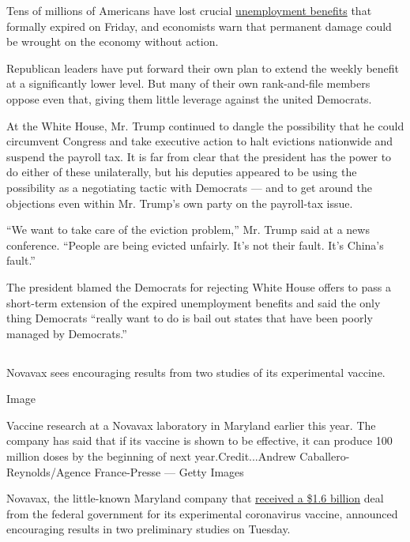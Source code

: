 Tens of millions of Americans have lost crucial
\href{https://slack-redir.net/link?url=https\%3A\%2F\%2Fwww.nytimes3xbfgragh.onion\%2F2020\%2F07\%2F30\%2Fbusiness\%2Funemployment-payments-change.html}{unemployment
benefits} that formally expired on Friday, and economists warn that
permanent damage could be wrought on the economy without action.

Republican leaders have put forward their own plan to extend the weekly
benefit at a significantly lower level. But many of their own
rank-and-file members oppose even that, giving them little leverage
against the united Democrats.

At the White House, Mr. Trump continued to dangle the possibility that
he could circumvent Congress and take executive action to halt evictions
nationwide and suspend the payroll tax. It is far from clear that the
president has the power to do either of these unilaterally, but his
deputies appeared to be using the possibility as a negotiating tactic
with Democrats --- and to get around the objections even within Mr.
Trump's own party on the payroll-tax issue.

``We want to take care of the eviction problem,'' Mr. Trump said at a
news conference. ``People are being evicted unfairly. It's not their
fault. It's China's fault.''

The president blamed the Democrats for rejecting White House offers to
pass a short-term extension of the expired unemployment benefits and
said the only thing Democrats ``really want to do is bail out states
that have been poorly managed by Democrats.''

\hypertarget{-1}{%
\subsection{}\label{-1}}

Novavax sees encouraging results from two studies of its experimental
vaccine.

Image

Vaccine research at a Novavax laboratory in Maryland earlier this year.
The company has said that if its vaccine is shown to be effective, it
can produce 100 million doses by the beginning of next
year.Credit...Andrew Caballero-Reynolds/Agence France-Presse --- Getty
Images

Novavax, the little-known Maryland company that
\href{https://www.nytimes3xbfgragh.onion/2020/07/16/health/coronavirus-vaccine-novavax.html}{received
a \$1.6 billion} deal from the federal government for its experimental
coronavirus vaccine, announced encouraging results in two preliminary
studies on Tuesday.


